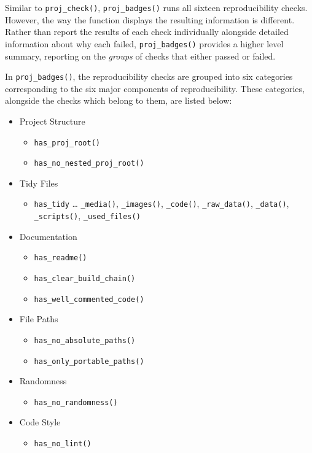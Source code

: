 \documentclass[12pt,twoside]{reedthesis}
\providecommand{\tightlist}{%
  \setlength{\itemsep}{0pt}\setlength{\parskip}{0pt}}
\begin{document}
Similar to \texttt{proj\_check()}, \texttt{proj\_badges()} runs all sixteen reproducibility checks. However, the way the function displays the resulting information is different. Rather than report the results of each check individually alongside detailed information about why each failed, \texttt{proj\_badges()} provides a higher level summary, reporting on the \emph{groups} of checks that either passed or failed.

In \texttt{proj\_badges()}, the reproducibility checks are grouped into six categories corresponding to the six major components of reproducibility. These categories, alongside the checks which belong to them, are listed below:
\begin{itemize}
\tightlist
\item
  Project Structure
  \begin{itemize}
  \tightlist
  \item
    \texttt{has\_proj\_root()}
  \item
    \texttt{has\_no\_nested\_proj\_root()}
  \end{itemize}
\item
  Tidy Files
  \begin{itemize}
  \tightlist
  \item
    \texttt{has\_tidy} \ldots{} \texttt{\_media()}, \texttt{\_images()}, \texttt{\_code()}, \texttt{\_raw\_data()}, \texttt{\_data()}, \texttt{\_scripts()}, \texttt{\_used\_files()}
  \end{itemize}
\item
  Documentation
  \begin{itemize}
  \tightlist
  \item
    \texttt{has\_readme()}
  \item
    \texttt{has\_clear\_build\_chain()}
  \item
    \texttt{has\_well\_commented\_code()}
  \end{itemize}
\item
  File Paths
  \begin{itemize}
  \tightlist
  \item
    \texttt{has\_no\_absolute\_paths()}
  \item
    \texttt{has\_only\_portable\_paths()}
  \end{itemize}
\item
  Randomness
  \begin{itemize}
  \tightlist
  \item
    \texttt{has\_no\_randomness()}
  \end{itemize}
\item
  Code Style
  \begin{itemize}
  \tightlist
  \item
    \texttt{has\_no\_lint()}
  \end{itemize}
\end{itemize}
\end{document}
